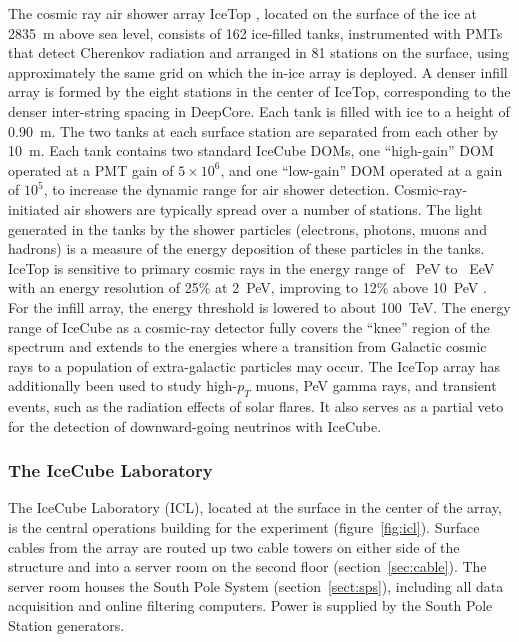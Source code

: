 The cosmic ray air shower array IceTop \cite{ICECUBE:IceTop}, located
on the surface of the ice at 2835~m above sea level, consists
of \num{162} ice-filled tanks, instrumented with PMTs that detect Cherenkov
radiation and arranged in \num{81} stations on the
surface, using approximately the same grid on which the in-ice
array is deployed. A denser infill array is formed by the eight
stations in the center of IceTop, corresponding to the denser
inter-string spacing
in DeepCore. Each tank is filled with ice to a height of \SI{0.90}{\meter}.  The two tanks at each surface station are separated from
each other by \SI{10}{\meter}. Each tank contains two standard IceCube
DOMs, one ``high-gain'' DOM operated at a PMT gain of $5 \times 10^{6}$, and one
``low-gain'' DOM operated at a gain of $10^{5}$, to increase the dynamic
range for air shower detection.  Cosmic-ray-initiated air showers are typically
spread over a number of stations. The light generated in the tanks by the
shower particles (electrons, photons, muons and hadrons) is a measure of
the energy deposition of these particles in the tanks. IceTop is sensitive to
primary cosmic rays in the energy range of \SI{}{PeV} to \SI{}{EeV}
with an energy resolution of 25\% at \SI{2}{PeV}, improving to 12\% above \SI{10}{PeV} \cite{IT:measurement}. For the infill
array, the energy threshold is lowered to about \SI{100}{TeV}. The energy
range of IceCube as a cosmic-ray detector fully covers the ``knee'' region
of the spectrum and extends to the energies where a transition from
Galactic cosmic rays to a population of extra-galactic 
particles may occur. The IceTop array has additionally been used to study
high-$p_T$ muons, PeV gamma rays, and transient events, such as the
radiation effects of solar flares. It also serves as a partial veto for the
detection of downward-going neutrinos with IceCube.   

\subsubsection{The IceCube Laboratory}

The IceCube Laboratory (ICL), located at the surface in the center
of the array, is the central operations building for the experiment
(figure~\ref{fig:icl}). Surface cables from the array are routed up two cable
towers on either side of the structure and into a server room on the second
floor (section~\ref{sec:cable}). The server room houses the South Pole System
(section~\ref{sect:sps}), including all data acquisition and online filtering
computers. Power is supplied by the South Pole Station generators.

